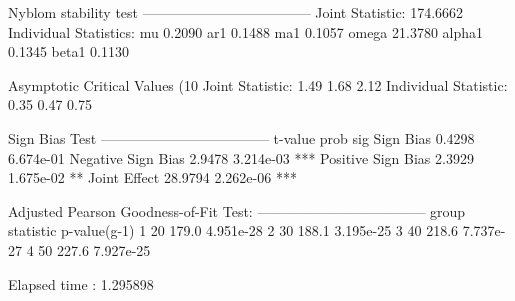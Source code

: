 \begin{Schunk}
\begin{Soutput}
Nyblom stability test
------------------------------------
Joint Statistic:  174.6662
Individual Statistics:
mu      0.2090
ar1     0.1488
ma1     0.1057
omega  21.3780
alpha1  0.1345
beta1   0.1130

Asymptotic Critical Values (10%
Joint Statistic:     	 1.49 1.68 2.12
Individual Statistic:	 0.35 0.47 0.75

Sign Bias Test
------------------------------------
                   t-value      prob sig
Sign Bias           0.4298 6.674e-01
Negative Sign Bias  2.9478 3.214e-03 ***
Positive Sign Bias  2.3929 1.675e-02  **
Joint Effect       28.9794 2.262e-06 ***


Adjusted Pearson Goodness-of-Fit Test:
------------------------------------
  group statistic p-value(g-1)
1    20     179.0    4.951e-28
2    30     188.1    3.195e-25
3    40     218.6    7.737e-27
4    50     227.6    7.927e-25


Elapsed time : 1.295898
\end{Soutput}
\end{Schunk}

